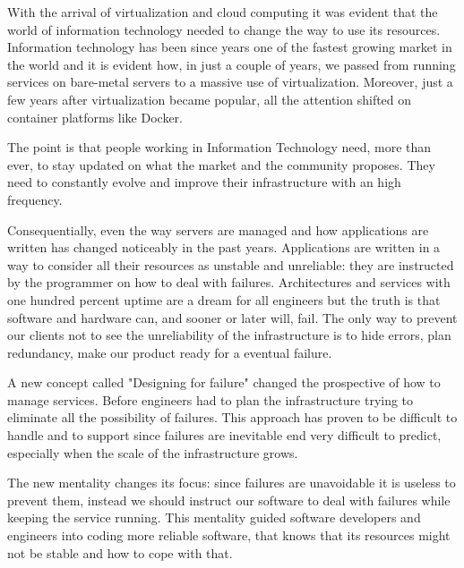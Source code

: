 
With the arrival of virtualization and cloud computing it was evident that
the world of information technology needed to change the way to use its
resources. Information technology has been since years one of the fastest
growing market in the world and it is evident how, in just a couple of
years, we passed from running services on bare-metal servers to a massive
use of virtualization. Moreover, just a few years after virtualization
became popular, all the attention shifted on container platforms like
Docker.

The point is that people working in Information Technology need, more than
ever, to stay updated on what the market and the community proposes. They
need to constantly evolve and improve their infrastructure with an high
frequency.

Consequentially, even the way servers are managed and how applications are
written has changed noticeably in the past years. Applications are written
in a way to consider all their resources as unstable and unreliable: they
are instructed by the programmer on how to deal with failures.
Architectures and services with one hundred percent uptime are a dream for
all engineers but the truth is that software and hardware can, and sooner
or later will, fail. The only way to prevent our clients not to see the
unreliability of the infrastructure is to hide errors, plan redundancy,
make our product ready for a eventual failure.

A new concept called "Designing for failure" changed the prospective of
how to manage services. Before engineers had to plan the infrastructure
trying to eliminate all the possibility of failures. This approach has
proven to be difficult to handle and to support since failures are
inevitable end very difficult to predict, especially when the scale of the
infrastructure grows.

The new mentality changes its focus: since failures are unavoidable it is
useless to prevent them, instead we should instruct our software to deal
with failures while keeping the service running. This mentality guided
software developers and engineers into coding more reliable software, that
knows that its resources might not be stable and how to cope with that.
